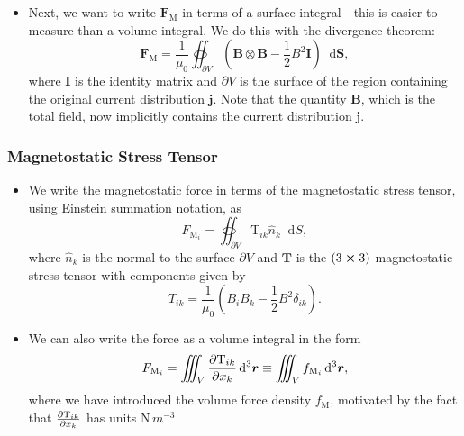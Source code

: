 \documentclass[11pt, a4paper]{article}
\newcommand{\diff}{\mathop{}\!\mathrm{d}} %
\newcommand{\dr}{\diff^{3} \r}  %
\renewcommand{\vec}[1]{\bm{#1}} %
\newcommand{\mat}[1]{\mathbf{#1}} %
\renewcommand{\r}{\vec{r}}
\newcommand{\B}{\vec{B}} %
\newcommand{\TT}{\mathrm{T}}  %
\newcommand{\mm}{\mu_{0}}  %
\renewcommand{\j}{\vec{j}}  %
\begin{document}
\begin{itemize}
	\item Next, we want to write $ \vec{F}_{\text{M}} $ in terms of a surface integral---this is easier to measure than a volume integral. We do this with the divergence theorem:
	\begin{equation*}
		\vec{F}_{\text{M}} = \frac{1}{\mm}\oiint_{\partial V}\left(\B \otimes \B - \frac{1}{2}B^{2}\mat{I}\right)\diff \vec{S},
	\end{equation*}
	where $ \mat{I} $ is the identity matrix and $ \partial V $ is the surface of the region containing the original current distribution $ \j $. Note that the quantity $ \B $, which is the total field, now implicitly contains the current distribution $ \j $.
\end{itemize}


\subsubsection{Magnetostatic Stress Tensor}
\begin{itemize}
	\item We write the magnetostatic force in terms of the magnetostatic stress tensor, using Einstein summation notation, as
	\begin{equation*}
		F_{\text{M}_{i}} = \oiint_{\partial V} \TT_{ik} \hat{n}_{k}\diff S,
	\end{equation*}
	where $ \hat{n}_{k} $ is the normal to the surface $ \partial V $ and $ \mat{T} $ is the $ (3 \cross 3) $ magnetostatic stress tensor with components given by
	\begin{equation*}
		T_{ik} = \frac{1}{\mm}\left(B_{i}B_{k} - \frac{1}{2}B^{2}\delta_{ik}\right).
	\end{equation*}
	
	\item We can also write the force as a volume integral in the form
	\begin{equation*}
		F_{\text{M}_{i}} = \iiint_{V}\pdv{\TT_{ik}}{x_{k}}\dr \equiv \iiint_{V}f_{\text{M}_{i}} \dr,
	\end{equation*} 
	where we have introduced the volume force density $ f_{\text{M}} $, motivated by the fact that $ \pdv{\TT_{ik}}{x_{k}} $ has units $ \si{\newton \, m^{-3}} $.
	
\end{itemize}
\end{document}

